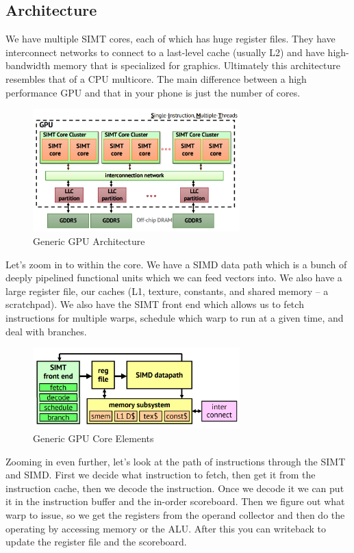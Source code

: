 \documentclass{article}
\begin{document}
\subsection{Architecture}

We have multiple SIMT cores, each of which has huge register files. They have interconnect networks to connect to a last-level cache (usually L2) and have high-bandwidth memory that is specialized for graphics. Ultimately this architecture resembles that of a CPU multicore. The main difference between a high performance  GPU and that in your phone is just the number of cores.

 \begin{figure}[ht!]
\centering
\includegraphics[width=80mm]{img/GPU.png}
\caption{Generic GPU Architecture}
\end{figure}

Let's zoom in to within the core. We have a SIMD data path which is a bunch of deeply pipelined functional units which we can feed vectors into. We also have a large register file, our caches (L1, texture, constants, and shared memory -- a scratchpad).  We also have the SIMT front end which allows us to fetch instructions for multiple warps, schedule which warp to run at a given time, and deal with branches. 


 \begin{figure}[ht!]
\centering
\includegraphics[width=80mm]{img/gpucore.png}
\caption{Generic GPU Core Elements}
\end{figure}

Zooming in even further, let's look at the path of instructions through the SIMT and SIMD. First we decide what instruction to fetch, then get it from the instruction cache, then we decode the instruction. Once we decode it we can put it in the instruction buffer and the in-order scoreboard. Then we figure out what warp to issue, so we get the registers from the operand collector and then do the operating by accessing memory or the ALU. After this you can writeback to update the register file and the scoreboard. 
\end{document}
